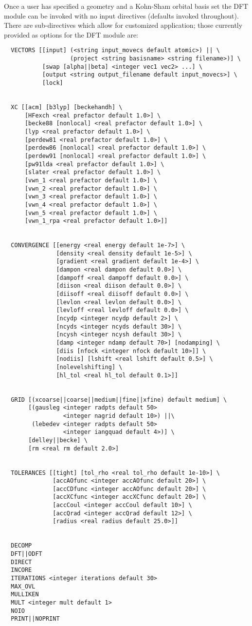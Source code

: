 Once a user has specified a geometry and a Kohn-Sham orbital basis set
the DFT module can be invoked with no input directives (defaults 
invoked throughout).  There are sub-directives which allow for 
customized application; those currently provided as options for 
the DFT module are:
\begin{verbatim}
  VECTORS [[input] (<string input_movecs default atomic>) || \
                   (project <string basisname> <string filename>)] \
           [swap [alpha||beta] <integer vec1 vec2> ...] \
           [output <string output_filename default input_movecs>] \
           [lock]


  XC [[acm] [b3lyp] [beckehandh] \
      [HFexch <real prefactor default 1.0>] \
      [becke88 [nonlocal] <real prefactor default 1.0>] \
      [lyp <real prefactor default 1.0>] \
      [perdew81 <real prefactor default 1.0>] \
      [perdew86 [nonlocal] <real prefactor default 1.0>] \
      [perdew91 [nonlocal] <real prefactor default 1.0>] \
      [pw91lda <real prefactor default 1.0>] \
      [slater <real prefactor default 1.0>] \
      [vwn_1 <real prefactor default 1.0>] \
      [vwn_2 <real prefactor default 1.0>] \
      [vwn_3 <real prefactor default 1.0>] \
      [vwn_4 <real prefactor default 1.0>] \
      [vwn_5 <real prefactor default 1.0>] \
      [vwn_1_rpa <real prefactor default 1.0>]]


  CONVERGENCE [[energy <real energy default 1e-7>] \
               [density <real density default 1e-5>] \
               [gradient <real gradient default 1e-4>] \
               [dampon <real dampon default 0.0>] \
               [dampoff <real dampoff default 0.0>] \
               [diison <real diison default 0.0>] \
               [diisoff <real diisoff default 0.0>] \
               [levlon <real levlon default 0.0>] \
               [levloff <real levloff default 0.0>] \
               [ncydp <integer ncydp default 2>] \
               [ncyds <integer ncyds default 30>] \
               [ncysh <integer ncysh default 30>] \
               [damp <integer ndamp default 70>] [nodamping] \
               [diis [nfock <integer nfock default 10>]] \
               [nodiis] [lshift <real lshift default 0.5>] \
               [nolevelshifting] \
               [hl_tol <real hl_tol default 0.1>]]


  GRID [(xcoarse||coarse||medium||fine||xfine) default medium] \
       [(gausleg <integer radpts default 50> 
                 <integer nagrid default 10>) ||\ 
        (lebedev <integer radpts default 50> 
                 <integer iangquad default 4>)] \ 
       [delley||becke] \
       [rm <real rm default 2.0>]
        

  TOLERANCES [[tight] [tol_rho <real tol_rho default 1e-10>] \
              [accAOfunc <integer accAOfunc default 20>] \
              [accCDfunc <integer accAOfunc default 20>] \
              [accXCfunc <integer accXCfunc default 20>] \
              [accCoul <integer accCoul default 10>] \
              [accQrad <integer accQrad default 12>] \
              [radius <real radius default 25.0>]]


  DECOMP
  DFT||ODFT
  DIRECT
  INCORE
  ITERATIONS <integer iterations default 30>
  MAX_OVL
  MULLIKEN
  MULT <integer mult default 1>
  NOIO
  PRINT||NOPRINT
\end{verbatim}
